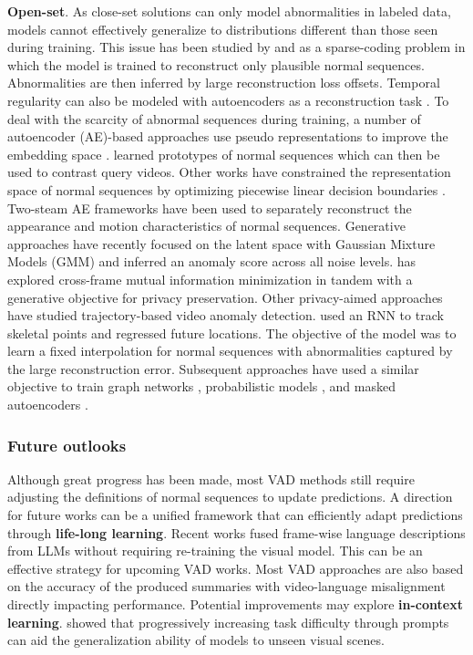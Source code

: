 \noindent
\textbf{Open-set}. As close-set solutions can only model abnormalities in labeled data, models cannot effectively generalize to distributions different than those seen during training. This issue has been studied by  and  as a sparse-coding  problem in which the model is trained to reconstruct only plausible normal sequences. Abnormalities are then inferred by large reconstruction loss offsets. Temporal regularity can also be modeled with autoencoders as a reconstruction task . To deal with the scarcity of abnormal sequences during training, a number of autoencoder (AE)-based approaches use pseudo representations to improve the embedding space .  learned prototypes of normal sequences which can then be used to contrast query videos. Other works have constrained the representation space of normal sequences by optimizing piecewise linear decision boundaries . Two-steam AE frameworks  have been used to separately reconstruct the appearance and motion characteristics of normal sequences. Generative approaches  have recently focused on the latent space with Gaussian Mixture Models (GMM) and inferred an anomaly score across all noise levels.  has explored cross-frame mutual information minimization in tandem with a generative objective for privacy preservation. Other privacy-aimed approaches have studied trajectory-based video anomaly detection.  used an RNN to track skeletal points and regressed future locations. The objective of the model was to learn a fixed interpolation for normal sequences with abnormalities captured by the large reconstruction error. Subsequent approaches have used a similar objective to train graph networks , probabilistic models , and masked autoencoders .


\subsubsection{Future outlooks}
\label{sec:prediction::VAD:::outlooks}


Although great progress has been made, most VAD methods still require adjusting the definitions of normal sequences to update predictions. A direction for future works can be a unified framework that can efficiently adapt predictions through \textbf{life-long learning}. Recent works  fused frame-wise language descriptions from LLMs without requiring re-training the visual model. This can be an effective strategy for upcoming VAD works. Most VAD approaches are also based on the accuracy of the produced summaries with video-language misalignment directly impacting performance. Potential improvements may explore \textbf{in-context learning}.  showed that progressively increasing task difficulty through prompts can aid the generalization ability of models to unseen visual scenes.
